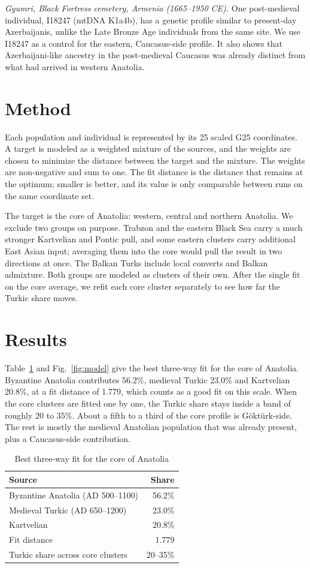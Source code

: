 \documentclass[conference,a4paper]{IEEEtran}
\begin{document}
\textit{Gyumri, Black Fortress cemetery, Armenia (1665--1950 CE).} One post-medieval individual, I18247 (mtDNA K1a4b), has a genetic profile similar to present-day Azerbaijanis, unlike the Late Bronze Age individuals from the same site. We use I18247 as a control for the eastern, Caucasus-side profile. It also shows that Azerbaijani-like ancestry in the post-medieval Caucasus was already distinct from what had arrived in western Anatolia.

\section{Method}\label{sec:method}
Each population and individual is represented by its 25 scaled G25 coordinates. A target is modeled as a weighted mixture of the sources, and the weights are chosen to minimize the distance between the target and the mixture. The weights are non-negative and sum to one. The fit distance is the distance that remains at the optimum; smaller is better, and its value is only comparable between runs on the same coordinate set.

The target is the core of Anatolia: western, central and northern Anatolia. We exclude two groups on purpose. Trabzon and the eastern Black Sea carry a much stronger Kartvelian and Pontic pull, and some eastern clusters carry additional East Asian input; averaging them into the core would pull the result in two directions at once. The Balkan Turks include local converts and Balkan admixture. Both groups are modeled as clusters of their own. After the single fit on the core average, we refit each core cluster separately to see how far the Turkic share moves.

\section{Results}\label{sec:results}
Table~\ref{tab:model} and Fig.~\ref{fig:model} give the best three-way fit for the core of Anatolia. Byzantine Anatolia contributes 56.2\%, medieval Turkic 23.0\% and Kartvelian 20.8\%, at a fit distance of 1.779, which counts as a good fit on this scale. When the core clusters are fitted one by one, the Turkic share stays inside a band of roughly 20 to 35\%. About a fifth to a third of the core profile is Göktürk-side. The rest is mostly the medieval Anatolian population that was already present, plus a Caucasus-side contribution.

\begin{table}[t]
\centering
\caption{Best three-way fit for the core of Anatolia}
\label{tab:model}
\begin{tabular}{@{}lr@{}}
\toprule
Source & Share \\
\midrule
Byzantine Anatolia (AD 500--1100) & 56.2\% \\
Medieval Turkic (AD 650--1200) & 23.0\% \\
Kartvelian & 20.8\% \\
\midrule
Fit distance & 1.779 \\
Turkic share across core clusters & 20--35\% \\
\bottomrule
\end{tabular}
\end{table}
\end{document}
